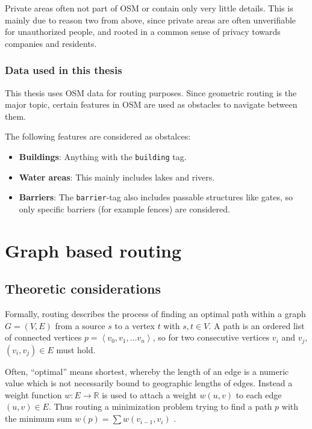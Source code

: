 			Private areas often not part of OSM or contain only very little details.
			This is mainly due to reason two from above, since private areas are often unverifiable for unauthorized people, and rooted in a common sense of privacy towards companies and residents.
			
		\subsubsection{Data used in this thesis}
		
			This thesis uses OSM data for routing purposes.
			Since geometric routing is the major topic, certain features in OSM are used as obstacles to navigate between them.
			
			The following features are considered as obstalces:
			\begin{itemize}
				\item \textbf{Buildings}: Anything with the \texttt{building} tag.
				\item \textbf{Water areas}: This mainly includes lakes and rivers.
				\item \textbf{Barriers}: The \texttt{barrier}-tag also includes passable structures like gates, so only specific barriers (for example fences) are considered.
			\end{itemize}

\section{Graph based routing}
\label{sec:graph-routing}

	\subsection{Theoretic considerations}
	\label{subsec:routing-theoretic-considerations}	
	
		Formally, routing describes the process of finding an optimal path within a graph $G=(V, E)$ from a source $s$ to a vertex $t$ with $s, t \in V$.
		A path is an ordered list of connected vertices $p=\left\langle v_0, v_1, \dots v_n \right\rangle$, so for two consecutive vertices $v_i$ and $v_j$, $(v_i, v_j) \in E$ must hold.
		
		Often, \enquote{optimal} means shortest, whereby the length of an edge is a numeric value which is not necessarily bound to geographic lengths of edges.
		Instead a weight function $w : E \rightarrow \mathbb{R}$ is used to attach a weight $w(u, v)$ to each edge $(u, v) \in E$.
		Thus routing a minimization problem trying to find a path $p$ with the minimum sum $w(p) = \sum{w(v_{i-1}, v_i)}$ \cite[645]{cormen-introduction-to-alg}.
		
